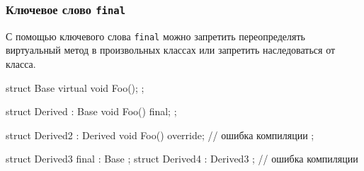 \documentclass[compress, 8pt, aspectratio=169]{beamer}
\begin{document}
\begin{frame}[fragile]

    \frametitle{Ключевое слово \texttt{final}}

    \hfill\break
    С помощью ключевого слова \verb|final|\footnotemark{} можно запретить переопределять
    виртуальный метод в произвольных классах или запретить наследоваться от
    класса.


    \begin{myinplacelisting}[minted language=cpp]
struct Base {
    virtual void Foo();
};

struct Derived : Base {
    void Foo() final;
};

struct Derived2 : Derived {
    void Foo() override; // ошибка компиляции
};

struct Derived3 final : Base {};
struct Derived4 : Derived3 {}; // ошибка компиляции
    \end{myinplacelisting}

\end{frame}
\end{document}
